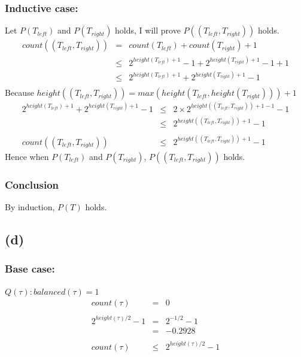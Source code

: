 \documentclass{article} %
\begin{document}
\subsubsection*{Inductive case:}
Let $P(T_{left})$ and $P(T_{right})$ holds, I will prove $P((T_{left},T_{right}))$ holds.\\
\[\begin{array}{rll}
    count((T_{left}, T_{right}))&=& count(T_{left}) + count(T_{right}) + 1\\
                                &\leq& 2^{height(T_{left})+1} -1 + 2^{height(T_{right}) +1} - 1 + 1\\
                                &\leq& 2^{height(T_{left})+1} + 2^{height(T_{right}) +1} - 1\\
\end{array}\]
Because $height((T_{left}, T_{right})) = max(height(T_{left}, height(T_{right}))) + 1$\\
\[\begin{array}{rll}
    2^{height(T_{left})+1} + 2^{height(T_{right}) +1} -1&\leq& 2 \times 2^{height((T_{left}, T_{right}))+1-1} -1\\
                                                        &\leq& 2^{height((T_{left}, T_{right}))+1} - 1\\
    \\
    count((T_{left}, T_{right}))&\leq& 2^{height((T_{left}, T_{right}))+1} - 1
\end{array}\]
Hence when $P(T_{left})$ and $P(T_{right})$, $P((T_{left},T_{right}))$ holds.
\subsubsection*{Conclusion}
By induction, $P(T)$ holds.\\
\subsection*{(d)}
\subsubsection*{Base case:}
$Q(\tau):balanced(\tau) = 1$\\
\[\begin{array}{rll}
    count(\tau) &=& 0\\
    \\
    2^{height(\tau)/2}-1&=& 2^{-1/2}-1\\
                        &=& -0.2928\\
    \\
    count(\tau) &\leq& 2^{height(\tau)/2}-1\\
\end{array}\]
\end{document}
